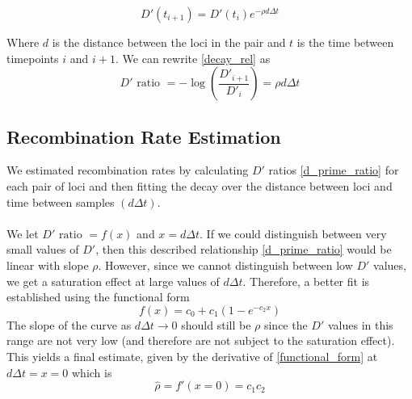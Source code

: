 \documentclass[12pt]{article}
\begin{document}
\begin{equation}\label{decay_rel}
D'(t_{i+1}) =  D'(t_i)  e^{-\rho d \Delta t}
\end{equation}

\noindent Where $d$ is the distance between the loci in the pair and $t$ is the time between timepoints $i$ and $i+1$. We can rewrite \eqref{decay_rel} as
\begin{equation}\label{d_prime_ratio}
D' \text{ ratio } = -\log \left(\frac{D'_{i+1}}{D'_i}\right) = \rho d \Delta t
\end{equation}



\subsection*{Recombination Rate Estimation}
We estimated recombination rates by calculating $D'$ ratios \eqref{d_prime_ratio} for each pair of loci and then fitting the decay over the distance between loci and time between samples $(d\Delta t)$.\\
\\
\noindent We let $D' \text{ ratio } = f(x)$ and $x = d \Delta t$. If we could distinguish between very small values of $D'$, then this described relationship \eqref{d_prime_ratio} would be linear with slope $\rho$. However, since we cannot distinguish between low $D'$ values, we get a saturation effect at large values of $d \Delta t$. Therefore, a better fit is established using the functional form
\begin{equation}\label{functional_form}
f(x) = c_0 + c_1(1-e^{-c_2 x})
\end{equation}
The slope of the curve as $d \Delta t \rightarrow 0$ should still be $\rho$ since the $D'$ values in this range are not very low (and therefore are not subject to the saturation effect). This yields a final estimate, given by the derivative of \eqref{functional_form} at $d \Delta t = x = 0$ which is
 \begin{equation}
\hat{\rho} =  f'(x = 0) = c_1c_2
 \end{equation}
\end{document}
